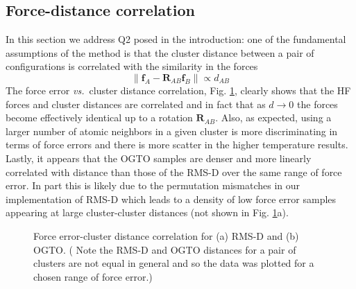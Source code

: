 \documentclass[journal=jctcce,manuscript=article]{achemso}
\newlength{\figwidth}
\newcommand{\figpath}{Figures}
\newcommand{\fref}[1]{{Fig. \ref{#1}}}
\newcommand{\vs}{{\it vs.\ }}
\newcommand{\fb}{\mathbf{f}}
\newcommand{\Rb}{\mathbf{R}}
\begin{document}
\subsection{Force-distance correlation}
In this section we address Q2 posed in the introduction:
one of the fundamental assumptions of the method is that the cluster distance between a pair of configurations is correlated with the similarity in the forces
\begin{equation}
\| \fb_A - \Rb_{AB} \fb_B \| \propto d_{AB}
\end{equation}
The force error \vs cluster distance correlation, \fref{fig:fvsd}, clearly shows that the HF forces and cluster distances are correlated and in fact that as $d\to 0$ the forces become effectively identical up to a rotation $\Rb_{AB}$. 
Also, as expected, using a larger number of atomic neighbors in a given cluster is more discriminating in terms of force errors and there is more scatter in the higher temperature results.
Lastly, it appears that the OGTO samples are denser and more linearly correlated with distance than those of the RMS-D over the same range of force error. 
In part this is likely due to the permutation mismatches in our implementation of RMS-D which leads to a density of low force error samples appearing at large cluster-cluster distances (not shown in \fref{fig:fvsd}a).


\begin{figure}[h]
{}
\caption{Force error-cluster distance correlation for (a) RMS-D and (b) OGTO.
( Note the RMS-D and OGTO distances for a pair of clusters are not equal in general and so the data was plotted for a chosen range of force error.)
}
\label{fig:fvsd}
\end{figure}


\end{document}
